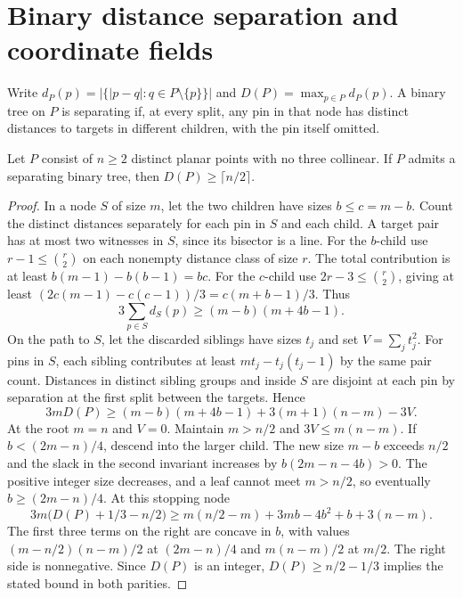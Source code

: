 \section{Binary distance separation and coordinate fields}

Write \(d_P(p)=|\{|p-q|:q\in P\setminus\{p\}\}|\) and \(D(P)=\max_{p\in P}d_P(p)\).
A binary tree on \(P\) is separating if, at every split, any pin in that node has distinct distances to targets in different children, with the pin itself omitted.

\begin{theorem}[982-D01]
Let \(P\) consist of \(n\ge2\) distinct planar points with no three collinear. If \(P\) admits a separating binary tree, then \(D(P)\ge\lceil n/2\rceil\).
\end{theorem}

\begin{proof}
In a node \(S\) of size \(m\), let the two children have sizes \(b\le c=m-b\).
Count the distinct distances separately for each pin in \(S\) and each child. A target pair has at most two witnesses in \(S\), since its bisector is a line. For the \(b\)-child use \(r-1\le\binom r2\) on each nonempty distance class of size \(r\). The total contribution is at least \(b(m-1)-b(b-1)=bc\). For the \(c\)-child use \(2r-3\le\binom r2\), giving at least \((2c(m-1)-c(c-1))/3=c(m+b-1)/3\). Thus
\[
 3\sum_{p\in S}d_S(p)\ge(m-b)(m+4b-1).
\]
On the path to \(S\), let the discarded siblings have sizes \(t_j\) and set \(V=\sum_j t_j^2\). For pins in \(S\), each sibling contributes at least \(mt_j-t_j(t_j-1)\) by the same pair count. Distances in distinct sibling groups and inside \(S\) are disjoint at each pin by separation at the first split between the targets. Hence
\[
 3mD(P)\ge(m-b)(m+4b-1)+3(m+1)(n-m)-3V.
\]
At the root \(m=n\) and \(V=0\). Maintain \(m>n/2\) and \(3V\le m(n-m)\). If \(b<(2m-n)/4\), descend into the larger child. The new size \(m-b\) exceeds \(n/2\) and the slack in the second invariant increases by \(b(2m-n-4b)>0\). The positive integer size decreases, and a leaf cannot meet \(m>n/2\), so eventually \(b\ge(2m-n)/4\). At this stopping node
\[
 3m\bigl(D(P)+1/3-n/2\bigr)
 \ge m(n/2-m)+3mb-4b^2+b+3(n-m).
\]
The first three terms on the right are concave in \(b\), with values \((m-n/2)(n-m)/2\) at \((2m-n)/4\) and \(m(n-m)/2\) at \(m/2\). The right side is nonnegative. Since \(D(P)\) is an integer, \(D(P)\ge n/2-1/3\) implies the stated bound in both parities.
\end{proof}

